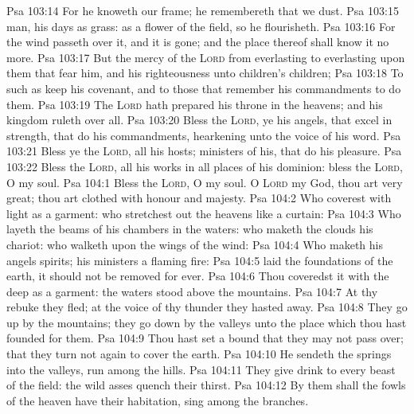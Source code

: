 \vs Psa 103:14 For he knoweth our frame; he remembereth that we  dust.
\vs Psa 103:15  man, his days  as grass: as a flower of the field, so he flourisheth.
\vs Psa 103:16 For the wind passeth over it, and it is gone; and the place thereof shall know it no more.
\vs Psa 103:17 But the mercy of the \textsc{Lord}  from everlasting to everlasting upon them that fear him, and his righteousness unto children's children;
\vs Psa 103:18 To such as keep his covenant, and to those that remember his commandments to do them.
\vs Psa 103:19 The \textsc{Lord} hath prepared his throne in the heavens; and his kingdom ruleth over all.
\vs Psa 103:20 Bless the \textsc{Lord}, ye his angels, that excel in strength, that do his commandments, hearkening unto the voice of his word.
\vs Psa 103:21 Bless ye the \textsc{Lord}, all  his hosts;  ministers of his, that do his pleasure.
\vs Psa 103:22 Bless the \textsc{Lord}, all his works in all places of his dominion: bless the \textsc{Lord}, O my soul.
\vs Psa 104:1 Bless the \textsc{Lord}, O my soul. O \textsc{Lord} my God, thou art very great; thou art clothed with honour and majesty.
\vs Psa 104:2 Who coverest  with light as  a garment: who stretchest out the heavens like a curtain:
\vs Psa 104:3 Who layeth the beams of his chambers in the waters: who maketh the clouds his chariot: who walketh upon the wings of the wind:
\vs Psa 104:4 Who maketh his angels spirits; his ministers a flaming fire:
\vs Psa 104:5  laid the foundations of the earth,  it should not be removed for ever.
\vs Psa 104:6 Thou coveredst it with the deep as  a garment: the waters stood above the mountains.
\vs Psa 104:7 At thy rebuke they fled; at the voice of thy thunder they hasted away.
\vs Psa 104:8 They go up by the mountains; they go down by the valleys unto the place which thou hast founded for them.
\vs Psa 104:9 Thou hast set a bound that they may not pass over; that they turn not again to cover the earth.
\vs Psa 104:10 He sendeth the springs into the valleys,  run among the hills.
\vs Psa 104:11 They give drink to every beast of the field: the wild asses quench their thirst.
\vs Psa 104:12 By them shall the fowls of the heaven have their habitation,  sing among the branches.
